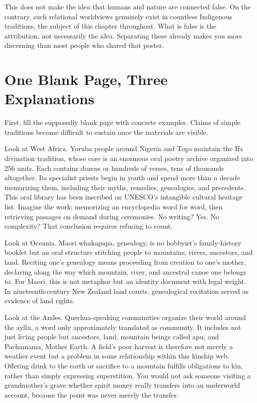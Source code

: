 This does not make the idea that humans and nature are connected false. On the contrary, such relational worldviews genuinely exist in countless Indigenous traditions, the subject of this chapter throughout. What is false is the attribution, not necessarily the idea. Separating these already makes you more discerning than most people who shared that poster.

\section{One Blank Page, Three Explanations}
First, fill the supposedly blank page with concrete examples. Claims of simple traditions become difficult to sustain once the materials are visible.

Look at West Africa. Yoruba people around Nigeria and Togo maintain the Ifa divination tradition, whose core is an enormous oral poetry archive organized into 256 units. Each contains dozens or hundreds of verses, tens of thousands altogether. Its specialist priests begin in youth and spend more than a decade memorizing them, including their myths, remedies, genealogies, and precedents. This oral library has been inscribed on UNESCO's intangible cultural heritage list. Imagine the work: memorizing an encyclopedia word for word, then retrieving passages on demand during ceremonies. No writing? Yes. No complexity? That conclusion requires refusing to count.

Look at Oceania. Maori whakapapa, genealogy, is no hobbyist's family-history booklet but an oral structure stitching people to mountains, rivers, ancestors, and land. Reciting one's genealogy means proceeding from creation to one's mother, declaring along the way which mountain, river, and ancestral canoe one belongs to. For Maori, this is not metaphor but an identity document with legal weight. In nineteenth-century New Zealand land courts, genealogical recitation served as evidence of land rights.

Look at the Andes. Quechua-speaking communities organize their world around the ayllu, a word only approximately translated as community. It includes not just living people but ancestors, land, mountain beings called apu, and Pachamama, Mother Earth. A field's poor harvest is therefore not merely a weather event but a problem in some relationship within this kinship web. Offering drink to the earth or sacrifice to a mountain fulfills obligations to kin, rather than simply expressing superstition. You would not ask someone visiting a grandmother's grave whether spirit money really transfers into an underworld account, because the point was never merely the transfer.

